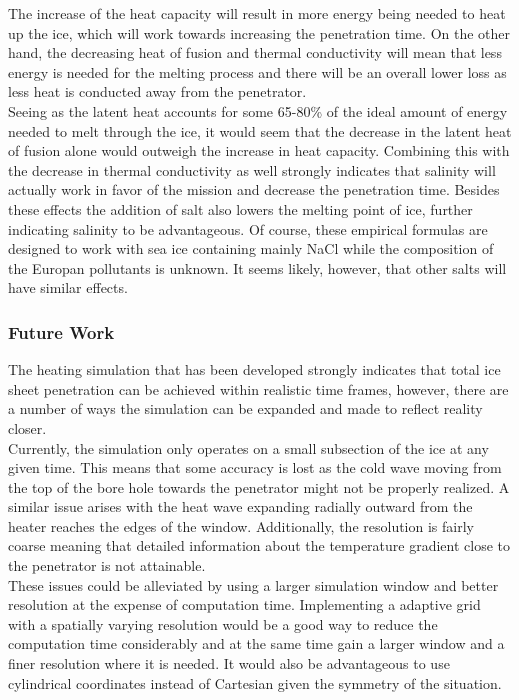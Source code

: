 \noindent
The increase of the heat capacity will result in more energy being needed to heat up the ice, which will work towards increasing the penetration time. On the other hand, the decreasing heat of fusion and thermal conductivity will mean that less energy is needed for the melting process and there will be an overall lower loss as less heat is conducted away from the penetrator.\\

\noindent
Seeing as the latent heat accounts for some 65-80\% of the ideal amount of energy needed to melt through the ice, it would seem that the decrease in the latent heat of fusion alone would outweigh the increase in heat capacity. Combining this with the decrease in thermal conductivity as well strongly indicates that salinity will actually work in favor of the mission and decrease the penetration time. Besides these effects the addition of salt also lowers the melting point of ice, further indicating salinity to be advantageous. Of course, these empirical formulas are designed to work with sea ice containing mainly NaCl while the composition of the Europan pollutants is unknown. It seems likely, however, that other salts will have similar effects. 



\subsubsection{Future Work}
The heating simulation that has been developed strongly indicates that total ice sheet penetration can be achieved within realistic time frames, however, there are a number of ways the simulation can be expanded and made to reflect reality closer.\\

\noindent
Currently, the simulation only operates on a small subsection of the ice at any given time. This means that some accuracy is lost as the cold wave moving from the top of the bore hole towards the penetrator might not be properly realized. A similar issue arises with the heat wave expanding radially outward from the heater reaches the edges of the window. Additionally, the resolution is fairly coarse meaning that detailed information about the temperature gradient close to the penetrator is not attainable.\\
These issues could be alleviated by using a larger simulation window and better resolution at the expense of computation time. Implementing a adaptive grid with a spatially varying resolution would be a good way to reduce the computation time considerably and at the same time gain a larger window and a finer resolution where it is needed. It would also be advantageous to use cylindrical coordinates instead of Cartesian given the symmetry of the situation.\\


